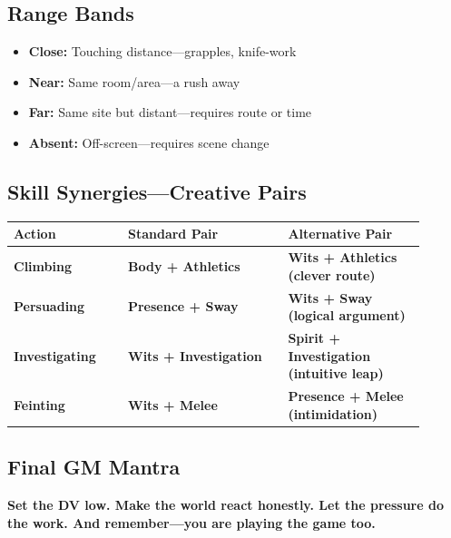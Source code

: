 \documentclass[10pt]{article}
\begin{document}
\subsection{Range Bands}
\begin{itemize}[leftmargin=*]
    \item \textbf{Close:} Touching distance—grapples, knife-work
    \item \textbf{Near:} Same room/area—a rush away
    \item \textbf{Far:} Same site but distant—requires route or time
    \item \textbf{Absent:} Off-screen—requires scene change
\end{itemize}

\subsection{Skill Synergies—Creative Pairs}
\begin{coretable}
\begin{tabular}{>{\bfseries}p{0.25\linewidth} >{\bfseries}p{0.35\linewidth} >{\bfseries}p{0.3\linewidth}}
\toprule
\textbf{Action} & \textbf{Standard Pair} & \textbf{Alternative Pair} \\
\midrule
Climbing & Body + Athletics & Wits + Athletics (clever route) \\
Persuading & Presence + Sway & Wits + Sway (logical argument) \\
Investigating & Wits + Investigation & Spirit + Investigation (intuitive leap) \\
Feinting & Wits + Melee & Presence + Melee (intimidation) \\
\bottomrule
\end{tabular}
\end{coretable}

\subsection{Final GM Mantra}
\begin{sidebar}
    \textbf{Set the DV low. Make the world react honestly. Let the pressure do the work. And remember—you are playing the game too.}
\end{sidebar}

\end{document}
